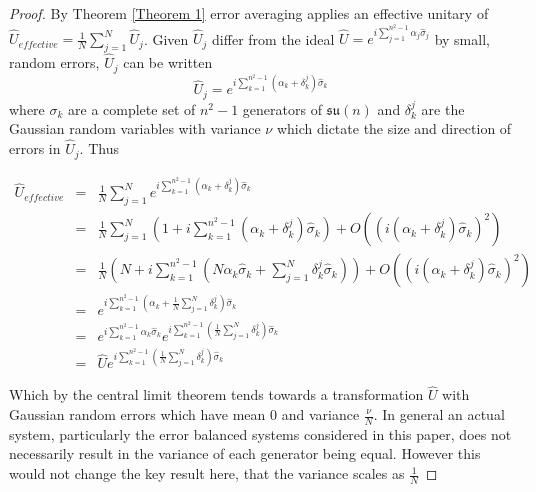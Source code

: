\documentclass[aps,pra,twocolumn,superscriptaddress,numerical]{revtex4-1}
\begin{document}
\begin{proof} \label{Proof 2}
By Theorem \ref{Theorem 1} error averaging applies an effective unitary of $\hat{U}_{effective}=\frac{1}{N}\sum_{j=1}^{N}\hat{U}_{j}$. Given $\hat{U}_{j}$ differ from the ideal $\hat{U}=e^{i\sum_{j=1}^{n^2-1}\alpha_{j}\hat{\sigma}_{j}}$  by small,  random errors, $\hat{U}_{j}$ can be written
\begin{equation}
	\hat{U}_{j}=e^{i\sum_{k=1}^{n^2-1}\left(\alpha_{k}+\delta_{k}^{j}\right)\hat{\sigma}_{k}}
\end{equation}
where $\sigma_{k}$ are a complete set of $n^2-1$ generators of $\mathfrak{su}(n)$ and $\delta_{k}^{j}$ are the Gaussian random variables with variance $\nu$ which dictate the size and direction of errors in $\hat{U}_{j}$. Thus

\begin{widetext}
\begin{eqnarray}
	\hat{U}_{effective} &=& \frac{1}{N}\sum_{j=1}^{N}e^{i\sum_{k=1}^{n^2-1}\left(\alpha_{k}+\delta_{k}^{j}\right)\hat{\sigma}_{k}} \\
	&=& \frac{1}{N}\sum_{j=1}^{N}\left(1+i\sum_{k=1}^{n^2-1}\left(\alpha_{k}+\delta_{k}^{j}\right)\hat{\sigma}_{k}\right) +O\left(\left(i\left(\alpha_{k}+\delta_{k}^{j}\right)\hat{\sigma}_{k}\right)^{2}\right) \\
	&=& \frac{1}{N}\left(N+i\sum_{k=1}^{n^2-1}\left(N\alpha_{k}\hat{\sigma}_{k}+\sum_{j=1}^{N}\delta_{k}^{j}\hat{\sigma}_{k}\right)\right)+O\left(\left(i\left(\alpha_{k}+\delta_{k}^{j}\right)\hat{\sigma}_{k}\right)^{2}\right) \\
	&=& e^{i\sum_{k=1}^{n^2-1}\left(\alpha_{k}+\frac{1}{N}\sum_{j=1}^{N}\delta_{k}^{j}\right)\hat{\sigma}_{k}} \\
	&=& e^{i\sum_{k=1}^{n^2-1}\alpha_{k}\hat{\sigma}_{k}} e^{i\sum_{k=1}^{n^2-1}\left(\frac{1}{N}\sum_{j=1}^{N}\delta_{k}^{j}\right)\hat{\sigma}_{k}} \\
	&=& \hat{U}e^{i\sum_{k=1}^{n^2-1}\left(\frac{1}{N}\sum_{j=1}^{N}\delta_{k}^{j}\right)\hat{\sigma}_{k}}
\end{eqnarray}
\end{widetext}

Which by the central limit theorem tends towards a transformation $\hat{U}$ with Gaussian random errors which have mean $0$ and variance $\frac{\nu}{N}$. In general an actual system, particularly the error balanced systems considered in this paper, does not necessarily result in the variance of each generator being equal. However this would not change the key result here, that the variance scales as $\frac{1}{N}$
\end{proof}
\end{document}
